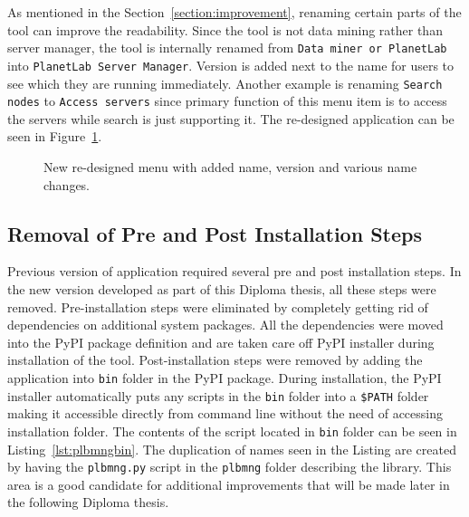 {{{{As mentioned in the Section~\ref{section:improvement}, renaming certain parts of the tool can improve the readability. Since the tool is not data mining rather than server manager, the tool is internally renamed from \texttt{Data miner or PlanetLab} into \texttt{PlanetLab Server Manager}. Version is added next to the name for users to see which they are running immediately. Another example is renaming \texttt{Search nodes} to \texttt{Access servers} since primary function of this menu item is to access the servers while search is just supporting it. The re-designed application can be seen in Figure~\ref{fig:redesigned}.\\

\begin{figure}[H]
	\centering
	\caption{New re-designed menu with added name, version and various name changes.}
	\label{fig:redesigned}
\end{figure}

\subsection{Removal of Pre and Post Installation Steps}
Previous version of application required several pre and post installation steps. In the new version developed as part of this Diploma thesis, all these steps were removed. Pre-installation steps were eliminated by completely getting rid of dependencies on additional system packages. All the dependencies were moved into the PyPI package definition and are taken care off PyPI installer during installation of the tool. Post-installation steps were removed by adding the application into \texttt{bin} folder in the PyPI package. During installation, the PyPI installer automatically puts any scripts in the \texttt{bin} folder into a \texttt{\$PATH} folder making it accessible directly from command line without the need of accessing installation folder. The contents of the script located in \texttt{bin} folder can be seen in Listing~\ref{lst:plbmngbin}. The duplication of names seen in the Listing are created by having the \texttt{plbmng.py} script in the \texttt{plbmng} folder describing the library. This area is a good candidate for additional improvements that will be made later in the following Diploma thesis.

}}}}
